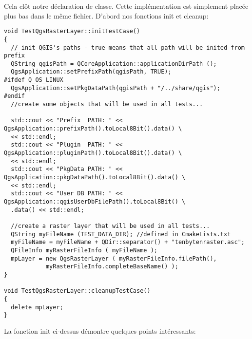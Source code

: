 Cela clôt notre déclaration de classe. Cette implémentation est simplement placée plus bas dans le même fichier. D'abord nos fonctions init et cleanup:

\begin{verbatim}
void TestQgsRasterLayer::initTestCase()
{
  // init QGIS's paths - true means that all path will be inited from prefix
  QString qgisPath = QCoreApplication::applicationDirPath ();
  QgsApplication::setPrefixPath(qgisPath, TRUE);
#ifdef Q_OS_LINUX
  QgsApplication::setPkgDataPath(qgisPath + "/../share/qgis");
#endif
  //create some objects that will be used in all tests...

  std::cout << "Prefix  PATH: " << QgsApplication::prefixPath().toLocal8Bit().data() \
  << std::endl;
  std::cout << "Plugin  PATH: " << QgsApplication::pluginPath().toLocal8Bit().data() \
  << std::endl;
  std::cout << "PkgData PATH: " << QgsApplication::pkgDataPath().toLocal8Bit().data() \
  << std::endl;
  std::cout << "User DB PATH: " << QgsApplication::qgisUserDbFilePath().toLocal8Bit() \
  .data() << std::endl;

  //create a raster layer that will be used in all tests...
  QString myFileName (TEST_DATA_DIR); //defined in CmakeLists.txt
  myFileName = myFileName + QDir::separator() + "tenbytenraster.asc";
  QFileInfo myRasterFileInfo ( myFileName );
  mpLayer = new QgsRasterLayer ( myRasterFileInfo.filePath(),
            myRasterFileInfo.completeBaseName() );
}

void TestQgsRasterLayer::cleanupTestCase()
{
  delete mpLayer;
}

\end{verbatim}

% 
La fonction init ci-dessus démontre quelques points intéressants:

